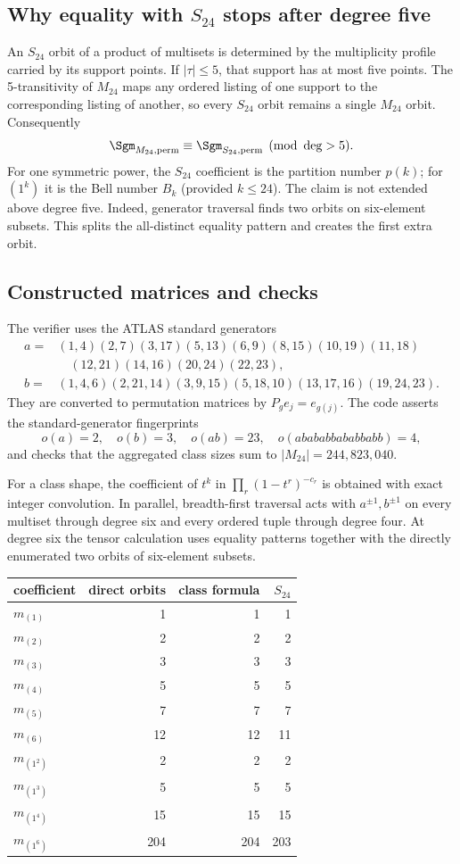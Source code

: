 \documentclass[10pt]{article}
\begin{document}
\subsection{Why equality with $S_{24}$ stops after degree five}
An $S_{24}$ orbit of a product of multisets is determined by the multiplicity
profile carried by its support points.  If $|\tau|\leq5$, that support has at
most five points.  The 5-transitivity of $M_{24}$ maps any ordered listing of
one support to the corresponding listing of another, so every $S_{24}$ orbit
remains a single $M_{24}$ orbit.  Consequently
\[
\Sgm_{M_{24},\mathrm{perm}}\equiv
\Sgm_{S_{24},\mathrm{perm}}\pmod{\deg>5}.
\]
For one symmetric power, the $S_{24}$ coefficient is the partition number
$p(k)$; for $(1^k)$ it is the Bell number $B_k$ (provided $k\leq24$).
The claim is not extended above degree five.  Indeed, generator traversal
finds two orbits on six-element subsets.  This splits the all-distinct
equality pattern and creates the first extra orbit.

\subsection{Constructed matrices and checks}
The verifier uses the ATLAS standard generators
\begin{align*}
a={}&(1,4)(2,7)(3,17)(5,13)(6,9)(8,15)(10,19)(11,18)\\
&\quad(12,21)(14,16)(20,24)(22,23),\\
b={}&(1,4,6)(2,21,14)(3,9,15)(5,18,10)(13,17,16)(19,24,23).
\end{align*}
They are converted to permutation matrices by $P_ge_j=e_{g(j)}$.  The code
asserts the standard-generator fingerprints
\[
o(a)=2,\quad o(b)=3,\quad o(ab)=23,\quad
o(abababbababbabb)=4,
\]
and checks that the aggregated class sizes sum to
$|M_{24}|=244{,}823{,}040$.

For a class shape, the coefficient of $t^k$ in
$\prod_r(1-t^r)^{-c_r}$ is obtained with exact integer convolution.  In
parallel, breadth-first traversal acts with $a^{\pm1},b^{\pm1}$ on every
multiset through degree six and every ordered tuple through degree four.  At
degree six the tensor calculation uses equality patterns together with the
directly enumerated two orbits of six-element subsets.

\begin{center}
\begin{tabular}{@{}lrrr@{}}\toprule
coefficient & direct orbits & class formula & $S_{24}$\\\midrule
$m_{(1)}$&1&1&1\\
$m_{(2)}$&2&2&2\\
$m_{(3)}$&3&3&3\\
$m_{(4)}$&5&5&5\\
$m_{(5)}$&7&7&7\\
$m_{(6)}$&12&12&11\\\addlinespace
$m_{(1^2)}$&2&2&2\\
$m_{(1^3)}$&5&5&5\\
$m_{(1^4)}$&15&15&15\\
$m_{(1^6)}$&204&204&203\\\bottomrule
\end{tabular}
\end{center}
\end{document}
